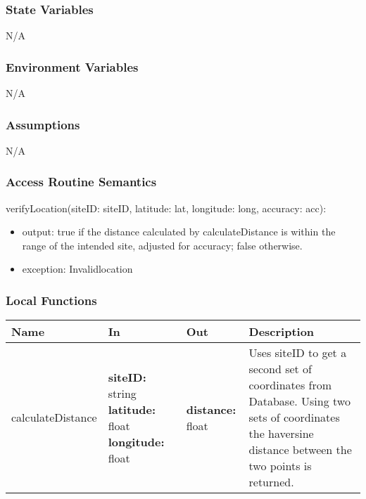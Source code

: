 \documentclass[12pt, titlepage]{article}
\begin{document}
\subsubsection{State Variables}

N/A

\subsubsection{Environment Variables}

N/A

\subsubsection{Assumptions}

N/A

\subsubsection{Access Routine Semantics}

\noindent verifyLocation(siteID: siteID, latitude: lat, longitude:
long, accuracy: acc):
\begin{itemize}
  \item output: true if the distance calculated by calculateDistance
    is within the range of the intended site, adjusted for accuracy;
    false otherwise.
  \item exception: Invalidlocation
\end{itemize}

\subsubsection{Local Functions}

\begin{center}
  \begin{tabular}{>{\raggedright}p{3cm} >{\raggedright}p{4cm}
    >{\raggedright}p{4cm} p{4.5cm}}
    \hline
    \textbf{Name} & \textbf{In} & \textbf{Out} & \textbf{Description} \\
    \hline
    calculateDistance & \textbf{siteID:} string \newline
    \textbf{latitude:} float \newline
    \textbf{longitude:} float & \textbf{distance:} float &
    Uses siteID to get a second set of coordinates from Database.
    Using two sets of coordinates the haversine distance between the
    two points is returned. \\
    \hline
  \end{tabular}
\end{center}
\end{document}
